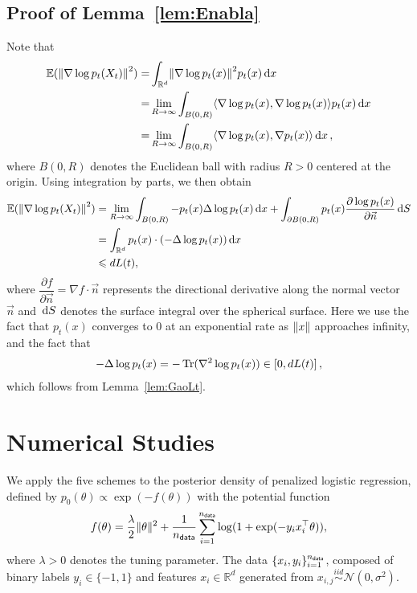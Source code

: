 \subsection{Proof of Lemma~\ref{lem:Enabla}}
Note that
\begin{align*}
    \mathbb{E}(\l|\nabla\log p_t(X_t)\r|^2)=&\int_{\mathbb{R}^d}\l|\nabla\log p_t(x)\r|^2p_t(x)\rmd x\\
    =&\lim_{R\to\infty}\int_{B(0,R)}\langle\nabla\log p_t(x),\nabla\log p_t(x)\rangle p_t(x)\rmd x\\
    =&\lim_{R\to\infty}\int_{B(0,R)}\langle\nabla\log p_t(x),\nabla p_t(x)\rangle \rmd x\,,
\end{align*}
where $B(0,R)$ denotes the Euclidean ball with radius $R>0$ centered at the origin.
Using integration by parts, we then obtain
\begin{align*}
    \mathbb{E}(\l|\nabla\log p_t(X_t)\r|^2)&=\lim_{R\to\infty}\int_{B(0,R)}-p_t(x)\Delta\log p_t(x)\rmd x+\int_{\partial B(0,R)}p_t(x)\dfrac{\partial \log p_t(x)}{\partial \vec{n}}\rmd S\\
    &=\int_{\mathbb{R}^d}p_t(x)\cdot(-\Delta\log p_t(x))\rmd x\\
    &\leqslant d L(t),
\end{align*}
where $\dfrac{\partial f}{\partial\vec{n}}=\nabla f\cdot\vec{n}$ represents the directional derivative along the normal vector $\vec{n}$ and ${\,\rm d} S$ denotes the surface integral over the spherical surface. Here we use the fact that $p_t(x)$ converges to $0$ at an exponential rate as $\l|x\r|$ approaches infinity, and the fact that
\begin{align*}
-\Delta\log p_t(x)=-\operatorname{Tr}(\nabla^2\log p_t(x))\in [0,dL(t)]  \,,
\end{align*}
which follows from Lemma~\ref{lem:GaoLt}.

\section{Numerical Studies}
\label{app:simulation}
We apply the five schemes to the posterior density of penalized logistic regression, defined by $p_0(\theta)\propto \exp(-f(\theta))$
with the potential function
\begin{align*}
	f(\theta)=\dfrac{\lambda}{2}\|\theta\|^2+\dfrac{1}{n_{\sf data}}\sum_{i=1}^{n_{\sf data}}\log(1+\exp(-y_ix_i^\top \theta)),
\end{align*}
where $\lambda>0$ denotes the tuning parameter. The data $\{x_i,y_i\}_{i=1}^{n_{\sf data}}$, composed of binary labels $y_i\in\{-1,1\}$ and features $x_i\in\mathbb{R}^d$ generated from $x_{i,j}\mathop{\sim}\limits^{iid}\mathcal{N}(0,\sigma^2)$.

